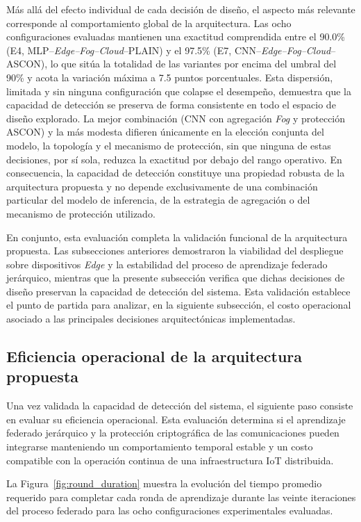 \documentclass[journal,article,submit,moreauthors]{Definitions/mdpi}
\begin{document}
Más allá del efecto individual de cada decisión de diseño, el aspecto más relevante corresponde al comportamiento global de la arquitectura. Las ocho configuraciones evaluadas mantienen una exactitud comprendida entre el 90.0\% (E4, MLP--\textit{Edge--Fog--Cloud}--PLAIN) y el 97.5\% (E7, CNN--\textit{Edge--Fog--Cloud}--ASCON), lo que sitúa la totalidad de las variantes por encima del umbral del 90\% y acota la variación máxima a 7.5 puntos porcentuales. Esta dispersión, limitada y sin ninguna configuración que colapse el desempeño, demuestra que la capacidad de detección se preserva de forma consistente en todo el espacio de diseño explorado. La mejor combinación (CNN con agregación \textit{Fog} y protección ASCON) y la más modesta difieren únicamente en la elección conjunta del modelo, la topología y el mecanismo de protección, sin que ninguna de estas decisiones, por sí sola, reduzca la exactitud por debajo del rango operativo. En consecuencia, la capacidad de detección constituye una propiedad robusta de la arquitectura propuesta y no depende exclusivamente de una combinación particular del modelo de inferencia, de la estrategia de agregación o del mecanismo de protección utilizado.

En conjunto, esta evaluación completa la validación funcional de la arquitectura propuesta. Las subsecciones anteriores demostraron la viabilidad del despliegue sobre dispositivos \textit{Edge} y la estabilidad del proceso de aprendizaje federado jerárquico, mientras que la presente subsección verifica que dichas decisiones de diseño preservan la capacidad de detección del sistema. Esta validación establece el punto de partida para analizar, en la siguiente subsección, el costo operacional asociado a las principales decisiones arquitectónicas implementadas.

\subsection{Eficiencia operacional de la arquitectura propuesta}

Una vez validada la capacidad de detección del sistema, el siguiente paso consiste en evaluar su eficiencia operacional. Esta evaluación determina si el aprendizaje federado jerárquico y la protección criptográfica de las comunicaciones pueden integrarse manteniendo un comportamiento temporal estable y un costo compatible con la operación continua de una infraestructura IoT distribuida.

La Figura~\ref{fig:round_duration} muestra la evolución del tiempo promedio requerido para completar cada ronda de aprendizaje durante las veinte iteraciones del proceso federado para las ocho configuraciones experimentales evaluadas.
\end{document}
